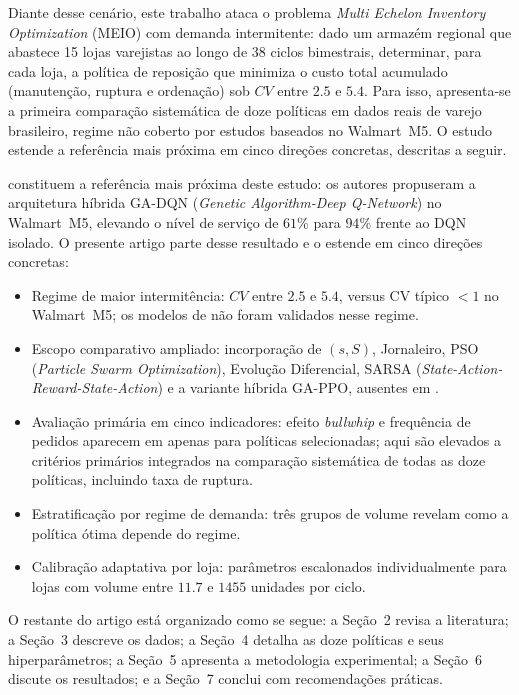 \documentclass[a4paper,11pt]{article}
\begin{document}
Diante desse cenário, este trabalho ataca o problema \textit{Multi Echelon Inventory Optimization} (MEIO) com demanda intermitente: dado
um armazém regional que abastece 15 lojas varejistas ao longo de 38
ciclos bimestrais, determinar, para cada loja, a política de reposição
que minimiza o custo total acumulado (manutenção, ruptura e ordenação)
sob $CV$ entre $2.5$ e $5.4$. Para isso, apresenta-se a primeira
comparação sistemática de doze políticas em dados reais de varejo
brasileiro, regime não coberto por estudos baseados no Walmart~M5.
O estudo estende a referência mais próxima em cinco direções concretas,
descritas a seguir.

\citet{zabraoui:2025} constituem a referência mais próxima deste
estudo: os autores propuseram a arquitetura híbrida GA-DQN
(\textit{Genetic Algorithm-Deep Q-Network}) no
Walmart~M5, elevando o nível de serviço de $61\%$ para $94\%$ frente ao
DQN isolado. O presente artigo parte desse resultado e o estende
em cinco direções concretas:

\begin{itemize}
  \item Regime de maior intermitência: $CV$ entre $2.5$ e $5.4$,
    versus CV típico $< 1$ no Walmart~M5; os modelos de
    \citet{zabraoui:2025} não foram validados nesse regime.
  \item Escopo comparativo ampliado: incorporação de $(s,S)$,
    Jornaleiro, PSO (\textit{Particle Swarm Optimization}),
    Evolução Diferencial,
    SARSA (\textit{State-Action-Reward-State-Action})
    e a variante híbrida GA-PPO, ausentes em \citet{zabraoui:2025}.
  \item Avaliação primária em cinco indicadores: efeito
    \textit{bullwhip} e frequência de pedidos aparecem em
    \citet{zabraoui:2025} apenas para políticas selecionadas; aqui
    são elevados a critérios primários integrados na comparação
    sistemática de todas as doze políticas, incluindo taxa de ruptura.
  \item Estratificação por regime de demanda: três grupos de
    volume revelam como a política ótima depende do regime.
  \item Calibração adaptativa por loja: parâmetros
    escalonados individualmente para lojas com volume entre
    $11.7$ e $1455$ unidades por ciclo.
\end{itemize}

O restante do artigo está organizado como se segue: a Seção~2
revisa a literatura; a Seção~3 descreve os dados; a Seção~4 detalha
as doze políticas e seus hiperparâmetros; a Seção~5 apresenta a
metodologia experimental; a Seção~6 discute os resultados; e a
Seção~7 conclui com recomendações práticas.
\end{document}
